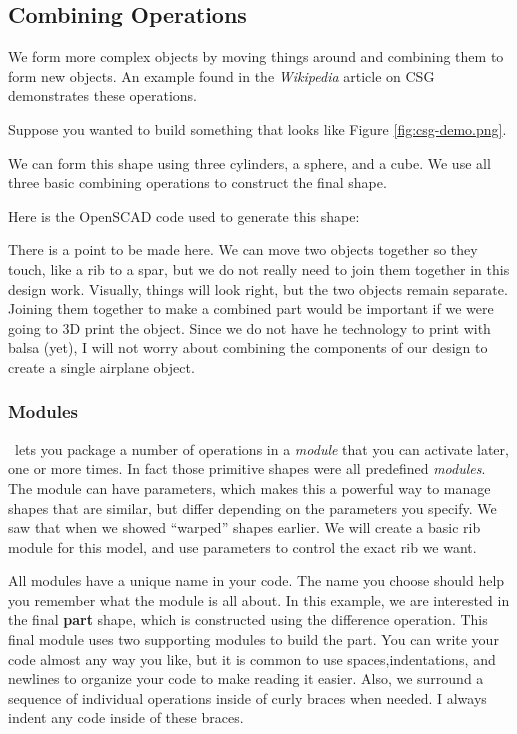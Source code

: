 \subsection{Combining Operations}

We form more complex objects by moving things around and combining them to form
new objects. An example found in the {\it Wikipedia} article on CSG~\cite{csgwiki}
demonstrates these operations.

Suppose you wanted to build something that looks like Figure \ref{fig:csg-demo.png}.


We can form this shape using three cylinders, a sphere, and a cube. We use all
three basic combining operations to construct the final shape.

Here is the OpenSCAD code used to generate this shape:


There is a point to be made here. We can move two objects together so they
touch, like a rib to a spar, but we do not really need to join them together in
this design work. Visually, things will look right, but the two objects remain
separate. Joining them together to make a combined part would be important if we
were going to 3D print the object. Since we do not have he technology to print
with balsa (yet), I will not worry about combining the components of our design
to create a single airplane object.

\subsubsection{Modules}

\osc\ lets you package a number of operations in a {\it module} that you can
activate later, one or more times. In fact those primitive shapes were all
predefined {\it modules}. The module can have parameters, which makes this a
powerful way to manage shapes that are similar, but differ depending on the
parameters you specify.  We saw that when we showed ``warped'' shapes earlier.
We will create a basic rib module for this model, and use parameters to control
the exact rib we want.

All modules have a unique name in your code.  The name you choose should help
you remember what the module is all about. In this example, we are interested
in the final {\bf part} shape, which is constructed using the difference
operation. This final module uses two supporting modules to build the part. You
can write your code almost any way you like, but it is common to use
spaces,indentations, and newlines to organize your code to make reading it
easier.  Also, we surround a sequence of individual operations inside of curly
braces when needed. I always indent any code inside of these braces.

